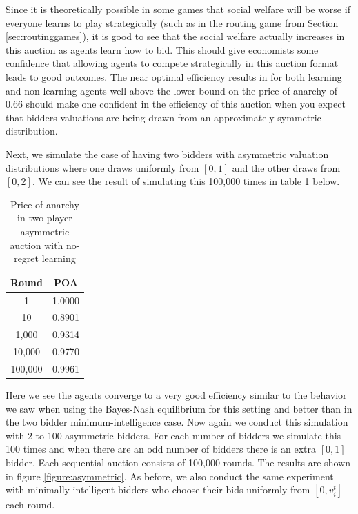 \documentclass[12pt,twoside]{reedthesis}
\begin{document}
Since it is theoretically possible in some games that social welfare will be worse if everyone learns to play strategically (such as in the routing game from Section \ref{sec:routinggames}), it is good to see that the social welfare actually increases in this auction as agents learn how to bid. This should give economists some confidence that allowing agents to compete strategically in this auction format leads to good outcomes. The near optimal efficiency results in for both learning and non-learning agents well above the lower bound on the price of anarchy of $0.66$ should make one confident in the efficiency of this auction when you expect that bidders valuations are being drawn from an approximately symmetric distribution.

Next, we simulate the case of having two bidders with asymmetric valuation distributions where one draws uniformly from $[0,1]$ and the other draws from $[0,2]$. We can see the result of simulating this 100,000 times in table \ref{table:5} below.

\begin{table}[h!]
	\begin{center}
		\begin{tabular}{ |c|c| }
			\hline
			Round & POA \\
			\hline
			1 & 1.0000 \\
			10 & 0.8901 \\
			1,000 & 0.9314 \\
			10,000 & 0.9770 \\
			100,000 & 0.9961 \\
			\hline
		\end{tabular}
		\caption{Price of anarchy in two player asymmetric auction with no-regret learning}
		\label{table:5}
	\end{center} 
\end{table}

Here we see the agents converge to a very good efficiency similar to the behavior we saw when using the Bayes-Nash equilibrium for this setting and better than in the two bidder minimum-intelligence case. Now again we conduct this simulation with 2 to 100 asymmetric bidders. For each number of bidders we simulate this 100 times and when there are an odd number of bidders there is an extra $[0,1]$ bidder. Each sequential auction consists of 100,000 rounds. The results are shown in figure \ref{figure:asymmetric}. As before, we also conduct the same experiment with minimally intelligent bidders who choose their bids uniformly from $[0,v_i^t]$ each round.
\end{document}
